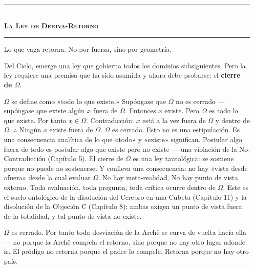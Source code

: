 \documentclass[10pt, openany, oneside]{book}
\renewcommand{\normalsize}{\fontsize{10}{13}\selectfont}
\begin{document}
\vspace{1.5em}


\begin{center}
    \rule{0.3\textwidth}{0.4pt}\\[0.5em]
    {\normalsize\bfseries\scshape La Ley de Deriva-Retorno}\\[0.3em]
    \rule{0.3\textwidth}{0.4pt}
\end{center}

\vspace{1em}

\noindent Lo que vaga retorna. No por fuerza, sino por geometría.

Del Ciclo, emerge una ley que gobierna todos los dominios subsiguientes. Pero la ley requiere una premisa que ha sido asumida y ahora debe probarse: el \textbf{cierre de $\Omega$}.

$\Omega$ se define como «todo lo que existe.» Supóngase que $\Omega$ no es cerrado --- supóngase que existe algún $x$ fuera de $\Omega$. Entonces $x$ existe. Pero $\Omega$ es todo lo que existe. Por tanto $x \in \Omega$. Contradicción: $x$ está a la vez fuera de $\Omega$ y dentro de $\Omega$. $\therefore$ Ningún $x$ existe fuera de $\Omega$. $\Omega$ es cerrado. Esto no es una estipulación. Es una consecuencia analítica de lo que «todo» y «existe» significan. Postular algo fuera de todo es postular algo que existe pero no existe --- una violación de la No-Contradicción (Capítulo 5). El cierre de $\Omega$ es una ley tautológica: se sostiene porque no puede no sostenerse. Y conlleva una consecuencia: no hay «vista desde afuera» desde la cual evaluar $\Omega$. No hay meta-realidad. No hay punto de vista externo. Toda evaluación, toda pregunta, toda crítica ocurre dentro de $\Omega$. Este es el suelo ontológico de la disolución del Cerebro-en-una-Cubeta (Capítulo 11) y la disolución de la Objeción C (Capítulo 8): ambas exigen un punto de vista fuera de la totalidad, y tal punto de vista no existe.

$\Omega$ es cerrado. Por tanto toda desviación de la Arch\={e} se curva de vuelta hacia ella --- no porque la Arch\={e} compela el retorno, sino porque no hay otro lugar adonde ir. El pródigo no retorna porque el padre lo compele. Retorna porque no hay otro país.

\vspace{0.5em}
\end{document}

